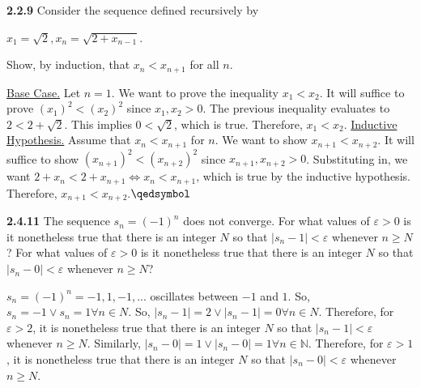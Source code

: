 \documentclass[12pt]{article}
\newcommand{\N}{\mathbb{N}}
\begin{document}
\begin{problem}\textbf{2.2.9}
Consider the sequence defined recursively by
\begin{center}
    $x_1=\sqrt{2},x_n=\sqrt{2+x_{n-1}}$.
\end{center}
Show, by induction, that $x_n<x_{n+1}$ for all $n$.
\end{problem}
\begin{solution}\newline
\underline{Base Case.}\newline
Let $n=1$.\newline 
We want to prove the inequality $x_1<x_2$.\newline
It will suffice to prove $(x_1)^2<(x_2)^2$ since $x_1,x_2>0$.\newline
The previous inequality evaluates to $2<2+\sqrt{2}$.\newline
This implies $0<\sqrt{2}$, which is true.\newline
Therefore, $x_1<x_2$.\newline
\underline{Inductive Hypothesis.}\newline
Assume that $x_n<x_{n+1}$ for $n$.\newline
We want to show $x_{n+1}<x_{n+2}$.\newline
It will suffice to show $(x_{n+1})^2<(x_{n+2})^2$ since $x_{n+1},x_{n+2}>0$.\newline
Substituting in, we want $2+x_n<2+x_{n+1}\iff x_n<x_{n+1}$, which is true by the inductive hypothesis.\newline
Therefore, $x_{n+1}<x_{n+2}.$\flushright$\qedsymbol$

\end{solution}

\begin{problem}\textbf{2.4.11}
The sequence $s_n=(-1)^n$ does not converge. For what values of $\varepsilon>0$ is it nonetheless true that there is an integer $N$ so that $|s_n-1|<\varepsilon$ whenever $n\geq N$? For what values of $\varepsilon>0$ is it nonetheless true that there is an integer $N$ so that $|s_n-0|<\varepsilon$ whenever $n\geq N$?
\end{problem}
\begin{solution}\newline
$s_n=(-1)^n={-1,1,-1,...}$ oscillates between $-1$ and $1$.\newline
So, $s_n=-1\lor s_n=1\forall n\in N$.\newline
So, $|s_n-1|=2\lor|s_n-1|=0\forall n\in N$.\newline
Therefore, for $\varepsilon>2$, it is nonetheless true that there is an integer $N$ so that $|s_n-1|<\varepsilon$ whenever $n\geq N$.\newline\newline
Similarly, $|s_n-0|=1\lor |s_n-0|=1\forall n\in \N$.\newline
Therefore, for $\varepsilon>1$, it is nonetheless true that there is an integer $N$ so that $|s_n-0|<\varepsilon$ whenever $n\geq N$.
\end{solution}
\end{document}
